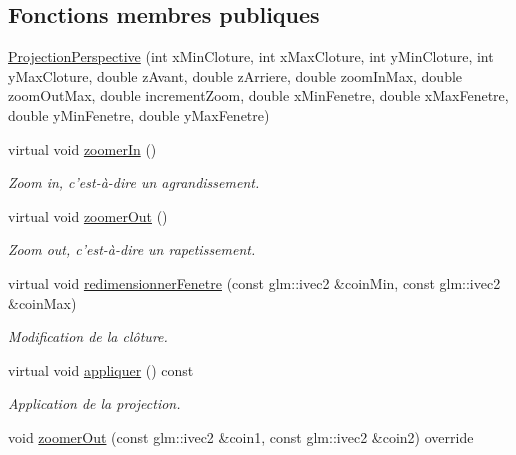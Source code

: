 \subsection*{Fonctions membres publiques}
\begin{DoxyCompactItemize}
\item 
\hyperlink{classvue_1_1_projection_perspective_a29ac42a37ddadf28bd6f9e87c285e20d}{Projection\-Perspective} (int x\-Min\-Cloture, int x\-Max\-Cloture, int y\-Min\-Cloture, int y\-Max\-Cloture, double z\-Avant, double z\-Arriere, double zoom\-In\-Max, double zoom\-Out\-Max, double increment\-Zoom, double x\-Min\-Fenetre, double x\-Max\-Fenetre, double y\-Min\-Fenetre, double y\-Max\-Fenetre)
\item 
virtual void \hyperlink{classvue_1_1_projection_perspective_ae9191189dc5beeccb9a5bd36f01c2810}{zoomer\-In} ()
\begin{DoxyCompactList}\small\item\em Zoom in, c'est-\/à-\/dire un agrandissement. \end{DoxyCompactList}\item 
virtual void \hyperlink{classvue_1_1_projection_perspective_a8ba8b36ef438fbf7261b496ed4b2016e}{zoomer\-Out} ()
\begin{DoxyCompactList}\small\item\em Zoom out, c'est-\/à-\/dire un rapetissement. \end{DoxyCompactList}\item 
virtual void \hyperlink{classvue_1_1_projection_perspective_a2f5070449526d0bc1bea6c4ef0622cd5}{redimensionner\-Fenetre} (const glm\-::ivec2 \&coin\-Min, const glm\-::ivec2 \&coin\-Max)
\begin{DoxyCompactList}\small\item\em Modification de la clôture. \end{DoxyCompactList}\item 
virtual void \hyperlink{classvue_1_1_projection_perspective_ad84636f5d14a0687d876567f917f80fb}{appliquer} () const 
\begin{DoxyCompactList}\small\item\em Application de la projection. \end{DoxyCompactList}\item 
\hypertarget{classvue_1_1_projection_perspective_ab3bdccdcbab18f84b98a70ff91331ba6}{void \hyperlink{classvue_1_1_projection_perspective_ab3bdccdcbab18f84b98a70ff91331ba6}{zoomer\-Out} (const glm\-::ivec2 \&coin1, const glm\-::ivec2 \&coin2) override}\label{classvue_1_1_projection_perspective_ab3bdccdcbab18f84b98a70ff91331ba6}


\end{DoxyCompactItemize}

